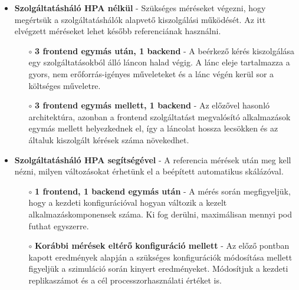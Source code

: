 \begin{itemize}
	\item \textbf{Szolgáltatásháló HPA nélkül} - Szükséges méréseket végezni, hogy megértsük a szolgáltatáshálók alapvető kiszolgálási működését. Az itt elvégzett méréseket lehet később referenciának használni.
	\begin{itemize}
		\item[$\circ$] \textbf{3 frontend egymás után, 1 backend} - A beérkező kérés kiszolgálása  egy szolgáltatásokból álló láncon halad végig. A lánc eleje tartalmazza a gyors, nem erőforrás-igényes műveleteket és a lánc végén kerül sor a költséges műveletre. 
		
		\item[$\circ$] \textbf{3 frontend egymás mellett, 1 backend} - Az előzővel hasonló architektúra, azonban a frontend szolgáltatást megvalósító alkalmazások egymás mellett helyezkednek el, így a láncolat hossza lecsökken és az általuk kiszolgált kérések száma növekedhet.
	\end{itemize}
	
	\item \textbf{Szolgáltatásháló HPA segítségével} - A referencia mérések után meg kell nézni, milyen változásokat érhetünk el a beépített automatikus skálázóval.
	
	\begin{itemize}
		\item[$\circ$] \textbf{1 frontend, 1 backend egymás után} - A mérés során megfigyeljük, hogy a kezdeti konfigurációval hogyan változik a kezelt alkalmazáskomponensek száma. Ki fog derülni, maximálisan mennyi pod futhat egyszerre. 
		
		\item[$\circ$] \textbf{Korábbi mérések eltérő konfiguráció mellett} - Az előző pontban kapott eredmények alapján a szükséges konfigurációk módosítása mellett figyeljük a szimuláció során kinyert eredményeket. Módosítjuk a kezdeti replikaszámot és a cél processzorhasználati értéket is.
		
	\end{itemize}
	
\end{itemize}


